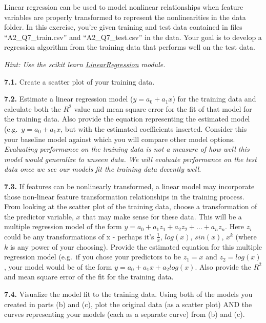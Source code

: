 \documentclass[
  letterpaper,
  DIV=11,
  numbers=noendperiod]{scrartcl}
\begin{document}
Linear regression can be used to model nonlinear relationships when
feature variables are properly transformed to represent the
nonlinearities in the data folder. In this exercise, you're given
training and test data contained in files ``A2\_Q7\_train.csv'' and
``A2\_Q7\_test.csv'' in the data. Your goal is to develop a regression
algorithm from the training data that performs well on the test data.

\emph{Hint: Use the scikit learn
\href{http://scikit-learn.org/stable/modules/generated/sklearn.linear_model.LinearRegression.html}{LinearRegression}
module.}

\textbf{7.1.} Create a scatter plot of your training data.

\textbf{7.2.} Estimate a linear regression model (\(y = a_0 + a_1 x\))
for the training data and calculate both the \(R^2\) value and mean
square error for the fit of that model for the training data. Also
provide the equation representing the estimated model
(e.g.~\(y = a_0 + a_1 x\), but with the estimated coefficients inserted.
Consider this your baseline model against which you will compare other
model options. \emph{Evaluating performance on the training data is not
a measure of how well this model would generalize to unseen data. We
will evaluate performance on the test data once we see our models fit
the training data decently well.}

\textbf{7.3.} If features can be nonlinearly transformed, a linear model
may incorporate those non-linear feature transformation relationships in
the training process. From looking at the scatter plot of the training
data, choose a transformation of the predictor variable, \(x\) that may
make sense for these data. This will be a multiple regression model of
the form \(y = a_0 + a_1 z_1 + a_2 z_2 + \ldots + a_n z_n\). Here
\(z_i\) could be any transformations of x - perhaps it's
\(\frac{1}{x}\), \(log(x)\), \(sin(x)\), \(x^k\) (where \(k\) is any
power of your choosing). Provide the estimated equation for this
multiple regression model (e.g.~if you chose your predictors to be
\(z_1 = x\) and \(z_2 = log(x)\), your model would be of the form
\(y = a_0 + a_1 x + a_2 log(x)\). Also provide the \(R^2\) and mean
square error of the fit for the training data.

\textbf{7.4.} Visualize the model fit to the training data. Using both
of the models you created in parts (b) and (c), plot the original data
(as a scatter plot) AND the curves representing your models (each as a
separate curve) from (b) and (c).
\end{document}
